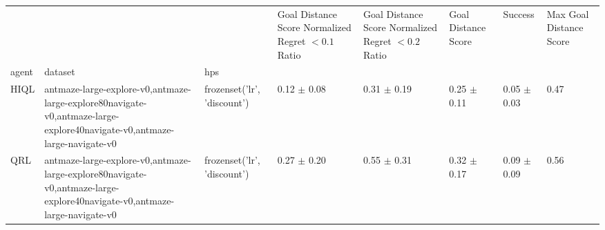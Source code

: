 \begin{tabular}{llllllll}
\toprule
 &  &  & Goal Distance Score Normalized Regret $< 0.1$ Ratio & Goal Distance Score Normalized Regret $< 0.2$ Ratio & Goal Distance Score & Success & Max Goal Distance Score \\
agent & dataset & hps &  &  &  &  &  \\
\midrule
HIQL & antmaze-large-explore-v0,antmaze-large-explore80navigate-v0,antmaze-large-explore40navigate-v0,antmaze-large-navigate-v0 & frozenset({'lr', 'discount'}) & 0.12 $\pm$ 0.08 & 0.31 $\pm$ 0.19 & 0.25 $\pm$ 0.11 & 0.05 $\pm$ 0.03 & 0.47 \\
\cline{1-8} \cline{2-8}
QRL & antmaze-large-explore-v0,antmaze-large-explore80navigate-v0,antmaze-large-explore40navigate-v0,antmaze-large-navigate-v0 & frozenset({'lr', 'discount'}) & 0.27 $\pm$ 0.20 & 0.55 $\pm$ 0.31 & 0.32 $\pm$ 0.17 & 0.09 $\pm$ 0.09 & 0.56 \\
\cline{1-8} \cline{2-8}
\bottomrule
\end{tabular}

